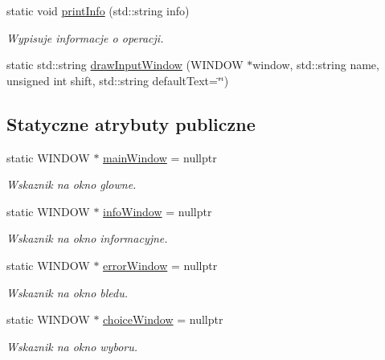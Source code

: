 \begin{DoxyCompactItemize}
\mbox{\label{class_windows_a3c65349f0c3012ddca58989d31e9ce3b}} 
static void \mbox{\hyperlink{class_windows_a3c65349f0c3012ddca58989d31e9ce3b}{print\+Info}} (std\+::string info)
\begin{DoxyCompactList}\small\item\em Wypisuje informacje o operacji. \end{DoxyCompactList}\item 
static std\+::string \mbox{\hyperlink{class_windows_a4f328c05c0eabb280128ed123d99bf7c}{draw\+Input\+Window}} (W\+I\+N\+D\+OW $\ast$window, std\+::string name, unsigned int shift, std\+::string default\+Text=\char`\"{}\char`\"{})
\end{DoxyCompactItemize}
\subsection*{Statyczne atrybuty publiczne}
\begin{DoxyCompactItemize}
\item 
\mbox{\label{class_windows_a1a8a77907e7e33e9ba740e53cd5c229d}} 
static W\+I\+N\+D\+OW $\ast$ \mbox{\hyperlink{class_windows_a1a8a77907e7e33e9ba740e53cd5c229d}{main\+Window}} = nullptr
\begin{DoxyCompactList}\small\item\em Wskaznik na okno glowne. \end{DoxyCompactList}\item 
\mbox{\label{class_windows_a1f1f7841d914a7bf9f48ad6b52a14cd9}} 
static W\+I\+N\+D\+OW $\ast$ \mbox{\hyperlink{class_windows_a1f1f7841d914a7bf9f48ad6b52a14cd9}{info\+Window}} = nullptr
\begin{DoxyCompactList}\small\item\em Wskaznik na okno informacyjne. \end{DoxyCompactList}\item 
\mbox{\label{class_windows_a0fc1789a33acebebe571f14cd66139c1}} 
static W\+I\+N\+D\+OW $\ast$ \mbox{\hyperlink{class_windows_a0fc1789a33acebebe571f14cd66139c1}{error\+Window}} = nullptr
\begin{DoxyCompactList}\small\item\em Wskaznik na okno bledu. \end{DoxyCompactList}\item 
\mbox{\label{class_windows_afac69748f0f128493356850f4cba8566}} 
static W\+I\+N\+D\+OW $\ast$ \mbox{\hyperlink{class_windows_afac69748f0f128493356850f4cba8566}{choice\+Window}} = nullptr
\begin{DoxyCompactList}\small\item\em Wskaznik na okno wyboru. \end{DoxyCompactList}\end{DoxyCompactItemize}


